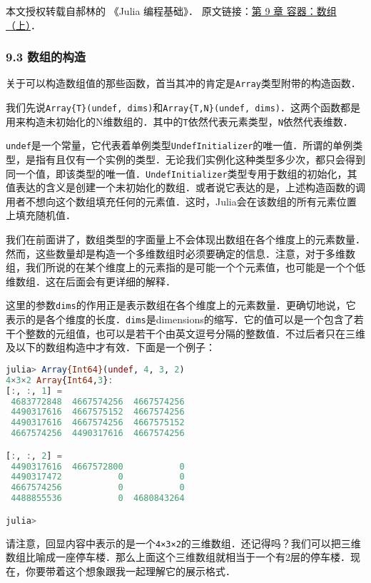 
本文授权转载自郝林的 《Julia 编程基础》． 原文链接：\href{https://github.com/hyper0x/JuliaBasics/blob/master/book/ch09.md}{第 9 章 容器：数组（上）}．


\subsubsection{9.3 数组的构造}

关于可以构造数组值的那些函数，首当其冲的肯定是\verb|Array|类型附带的构造函数．

我们先说\verb|Array{T}(undef, dims)|和\verb|Array{T,N}(undef, dims)|．这两个函数都是用来构造未初始化的N维数组的．其中的\verb|T|依然代表元素类型，\verb|N|依然代表维数．

\verb|undef|是一个常量，它代表着单例类型\verb|UndefInitializer|的唯一值．所谓的单例类型，是指有且仅有一个实例的类型．无论我们实例化这种类型多少次，都只会得到同一个值，即该类型的唯一值．\verb|UndefInitializer|类型专用于数组的初始化，其值表达的含义是创建一个未初始化的数组．或者说它表达的是，上述构造函数的调用者不想向这个数组填充任何的元素值．这时，Julia会在该数组的所有元素位置上填充随机值．

我们在前面讲了，数组类型的字面量上不会体现出数组在各个维度上的元素数量．然而，这些数量却是构造一个多维数组时必须要确定的信息．注意，对于多维数组，我们所说的在某个维度上的元素指的是可能一个个元素值，也可能是一个个低维数组．这在后面会有更详细的解释．

这里的参数\verb|dims|的作用正是表示数组在各个维度上的元素数量．更确切地说，它表示的是各个维度的长度．\verb|dims|是dimensions的缩写．它的值可以是一个包含了若干个整数的元组值，也可以是若干个由英文逗号分隔的整数值．不过后者只在三维及以下的数组构造中才有效．下面是一个例子：

\begin{lstlisting}[language=julia]
julia> Array{Int64}(undef, 4, 3, 2)
4×3×2 Array{Int64,3}:
[:, :, 1] =
 4683772848  4667574256  4667574256
 4490317616  4667575152  4667574256
 4490317616  4667574256  4667575152
 4667574256  4490317616  4667574256

[:, :, 2] =
 4490317616  4667572800           0
 4490317472           0           0
 4667574256           0           0
 4488855536           0  4680843264

julia> 
\end{lstlisting}

请注意，回显内容中表示的是一个\verb|4×3×2|的三维数组．还记得吗？我们可以把三维数组比喻成一座停车楼．那么上面这个三维数组就相当于一个有2层的停车楼．现在，你要带着这个想象跟我一起理解它的展示格式．

